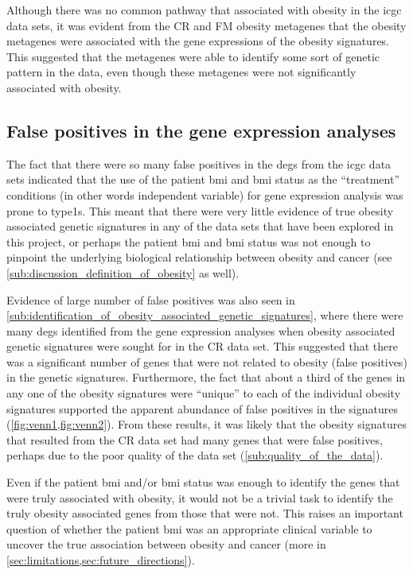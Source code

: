 Although there was no common pathway that associated with obesity in the \gls{icgc} data sets, it was evident from the CR and FM obesity metagenes that the obesity metagenes were associated with the gene expressions of the obesity signatures.
This suggested that the metagenes were able to identify some sort of genetic pattern in the data, even though these metagenes were not significantly associated with obesity.

\subsection{False positives in the gene expression analyses}
\label{sub:false_positives_in_gene_expression_analyses}

The fact that there were so many false positives in the \glspl{deg} from the \gls{icgc} data sets indicated that the use of the patient \gls{bmi} and \gls{bmi} status as the ``treatment'' conditions (in other words independent variable) for gene expression analysis was prone to \Glspl{type1}.
This meant that there were very little evidence of true obesity associated genetic signatures in any of the data sets that have been explored in this project, or perhaps the patient \gls{bmi} and \gls{bmi} status was not enough to pinpoint the underlying biological relationship between obesity and cancer (see \cref{sub:discussion_definition_of_obesity} as well).

Evidence of large number of false positives was also seen in \cref{sub:identification_of_obesity_associated_genetic_signatures}, where there were many \glspl{deg} identified from the gene expression analyses when obesity associated genetic signatures were sought for in the CR data set.
This suggested that there was a significant number of genes that were not related to obesity (false positives) in the genetic signatures.
Furthermore, the fact that about a third of the genes in any one of the obesity signatures were ``unique'' to each of the individual obesity signatures supported the apparent abundance of false positives in the signatures (\cref{fig:venn1,fig:venn2}).
From these results, it was likely that the obesity signatures that resulted from the CR data set had many genes that were false positives, perhaps due to the poor quality of the data set (\cref{sub:quality_of_the_data}).

Even if the patient \gls{bmi} and/or \gls{bmi} status was enough to identify the genes that were truly associated with obesity, it would not be a trivial task to identify the truly obesity associated genes from those that were not.
This raises an important question of whether the patient \gls{bmi} was an appropriate clinical variable to uncover the true association between obesity and cancer (more in \cref{sec:limitations,sec:future_directions}).


